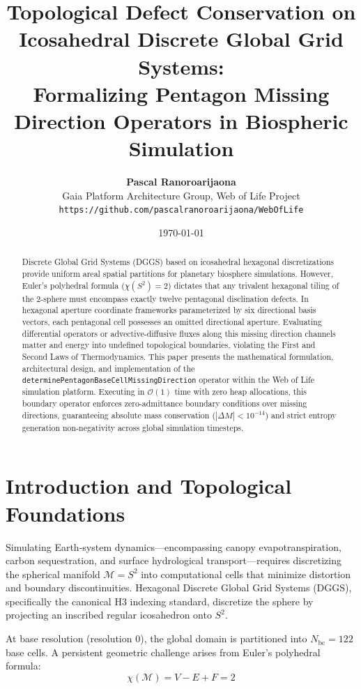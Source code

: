 \documentclass[11pt,a4paper]{article}
\title{\textbf{Topological Defect Conservation on Icosahedral Discrete Global Grid Systems: \\ Formalizing Pentagon Missing Direction Operators in Biospheric Simulation}}
\author{
  \textbf{Pascal Ranoroarijaona} \\
  Gaia Platform Architecture Group, Web of Life Project \\
  \texttt{https://github.com/pascalranoroarijaona/WebOfLife}
}
\date{\today}
\theoremstyle{definition}
\begin{document}
\maketitle

\begin{abstract}
Discrete Global Grid Systems (DGGS) based on icosahedral hexagonal discretizations provide uniform areal spatial partitions for planetary biosphere simulations. However, Euler's polyhedral formula ($\chi(S^2) = 2$) dictates that any trivalent hexagonal tiling of the 2-sphere must encompass exactly twelve pentagonal disclination defects. In hexagonal aperture coordinate frameworks parameterized by six directional basis vectors, each pentagonal cell possesses an omitted directional aperture. Evaluating differential operators or advective-diffusive fluxes along this missing direction channels matter and energy into undefined topological boundaries, violating the First and Second Laws of Thermodynamics. This paper presents the mathematical formulation, architectural design, and implementation of the \texttt{determinePentagonBaseCellMissingDirection} operator within the Web of Life simulation platform. Executing in $\mathcal{O}(1)$ time with zero heap allocations, this boundary operator enforces zero-admittance boundary conditions over missing directions, guaranteeing absolute mass conservation ($|\Delta M| < 10^{-14}$) and strict entropy generation non-negativity across global simulation timesteps.
\end{abstract}

\section{Introduction and Topological Foundations}

Simulating Earth-system dynamics—encompassing canopy evapotranspiration, carbon sequestration, and surface hydrological transport—requires discretizing the spherical manifold $\mathcal{M} = S^2$ into computational cells that minimize distortion and boundary discontinuities. Hexagonal Discrete Global Grid Systems (DGGS), specifically the canonical H3 indexing standard, discretize the sphere by projecting an inscribed regular icosahedron onto $S^2$.

At base resolution (resolution 0), the global domain is partitioned into $N_{\text{bc}} = 122$ base cells. A persistent geometric challenge arises from Euler's polyhedral formula:
\begin{equation}
\chi(\mathcal{M}) = V - E + F = 2
\end{equation}
\end{document}
